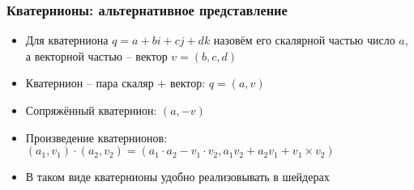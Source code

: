 \documentclass{beamer}
\begin{document}
\begin{frame}[fragile]
\frametitle{Кватернионы: альтернативное представление}
\begin{itemize}
\item Для кватерниона \begin{math}q = a + bi + cj + dk\end{math} назовём его скалярной частью число \begin{math}a\end{math}, а векторной частью -- вектор \begin{math}v = (b, c, d)\end{math}
\item Кватернион -- пара скаляр + вектор: \begin{math}q = (a, v)\end{math}
\pause
\item Сопряжённый кватернион: \begin{math}(a, -v)\end{math}
\pause
\item Произведение кватернионов: \begin{math}(a_1, v_1) \cdot (a_2, v_2) = (a_1 \cdot a_2 - v_1 \cdot v_2, a_1 v_2 + a_2 v_1 + v_1 \times v_2)\end{math}
\pause
\item В таком виде кватернионы удобно реализовывать в шейдерах
\end{itemize}
\end{frame}
\end{document}
